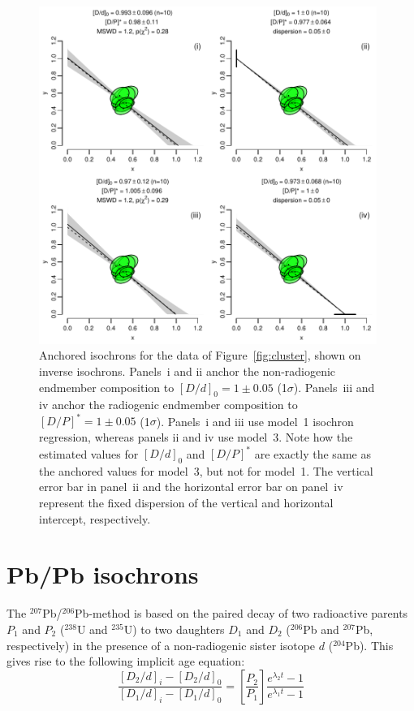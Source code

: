 \documentclass{article}
\begin{document}
\begin{figure}[!ht]
  \includegraphics[width=11cm]{fig3.pdf}
  \caption{Anchored isochrons for the data of
    Figure~\ref{fig:cluster}, shown on inverse isochrons. Panels~i and
    ii anchor the non-radiogenic endmember composition to $[D/d]_0 = 1
    \pm 0.05$ (1$\sigma$).  Panels~iii and iv anchor the radiogenic
    endmember composition to $[D/P]^\ast = 1 \pm 0.05$ (1$\sigma$).
    Panels~i and iii use model~1 isochron regression, whereas panels
    ii and iv use model~3. Note how the estimated values for $[D/d]_0$
    and $[D/P]^\ast$ are exactly the same as the anchored values for
    model~3, but not for model~1. The vertical error bar in panel~ii
    and the horizontal error bar on panel~iv represent the fixed
    dispersion of the vertical and horizontal intercept,
    respectively.}
  \label{fig:anchored}
\end{figure}

\section{Pb/Pb isochrons}\label{sec:PbPb}

The ${}^{207}$Pb/${}^{206}$Pb-method is based on the paired decay of
two radioactive parents $P_1$ and $P_2$ (${}^{238}$U and ${}^{235}$U)
to two daughters $D_1$ and $D_2$ (${}^{206}$Pb and ${}^{207}$Pb,
respectively) in the presence of a non-radiogenic sister isotope $d$
(${}^{204}$Pb). This gives rise to the following implicit age
equation:
\begin{equation}
  \frac{[D_2/d]_i-[D_2/d]_0}{[D_1/d]_i-[D_1/d]_0} =
  \left[\frac{P_2}{P_1}\right]
  \frac{e^{\lambda_2t}-1}{e^{\lambda_1t}-1}
  \label{eq:tPbPb}
\end{equation}
\end{document}

